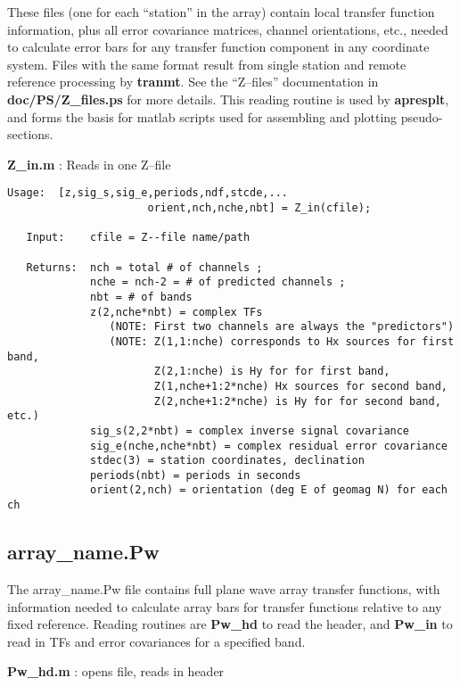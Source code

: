 These files (one for each ``station''  in the array) contain local
transfer function information, plus all error covariance matrices,
channel orientations, etc., needed
to calculate error bars for any transfer function component in any
coordinate system.  Files with the same format result from single
station and remote reference processing by {\bf tranmt}.  See
the ``Z--files'' documentation in {\bf doc/PS/Z\_files.ps}
for more details.  This reading routine
is used by {\bf apresplt}, and forms the basis for matlab scripts
used for assembling and plotting pseudo-sections.

{\bf Z\_in.m} : Reads in one Z--file 

\small
\begin{verbatim}
Usage:  [z,sig_s,sig_e,periods,ndf,stcde,...
                      orient,nch,nche,nbt] = Z_in(cfile);
                      
   Input:    cfile = Z--file name/path
                      
   Returns:  nch = total # of channels ;
             nche = nch-2 = # of predicted channels ;
             nbt = # of bands
             z(2,nche*nbt) = complex TFs
                (NOTE: First two channels are always the "predictors")
                (NOTE: Z(1,1:nche) corresponds to Hx sources for first band,
                       Z(2,1:nche) is Hy for for first band,
                       Z(1,nche+1:2*nche) Hx sources for second band,
                       Z(2,nche+1:2*nche) is Hy for for second band,  etc.)
             sig_s(2,2*nbt) = complex inverse signal covariance
             sig_e(nche,nche*nbt) = complex residual error covariance
             stdec(3) = station coordinates, declination
             periods(nbt) = periods in seconds
             orient(2,nch) = orientation (deg E of geomag N) for each ch
\end{verbatim}
\normalsize

\subsection{array\_name.Pw}

The array\_name.Pw file contains full
plane wave array transfer functions, with information
needed to calculate array bars for transfer functions relative to any fixed
reference.  Reading routines are {\bf Pw\_hd} to read the header, and
{\bf Pw\_in} to read in TFs and error covariances for a specified band.

{\bf Pw\_hd.m} : opens file, reads in header

